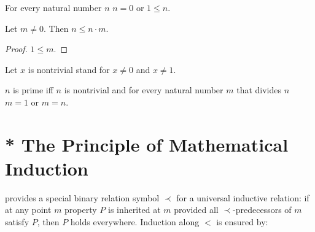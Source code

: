\documentclass{article}
\begin{document}
\begin{forthel}
\begin{lemma}
For every natural number $n$ $n = 0$ or $1 \leq n$.
\end{lemma}


\begin{lemma}
Let $m \neq 0$. Then $n \leq n \cdot m$.
\end{lemma}
\begin{proof}
$1 \leq m$.
\end{proof}

Let $x$ is nontrivial stand for $x \neq 0$ and $x \neq 1$.

\begin{definition}
$n$ is prime iff $n$ is nontrivial and
for every natural number $m$ that divides $n$ $m = 1$ or $m = n$.
\end{definition}

\end{forthel}

\section{* The Principle of Mathematical Induction}

\Naproche provides a special binary relation
symbol $\prec$ for a universal inductive relation: if at any
point $m$ property $P$ is inherited at $m$ provided all
$\prec$-predecessors of $m$ satisfy $P$, then $P$ holds everywhere.
Induction along $<$ is ensured by:
\end{document}
